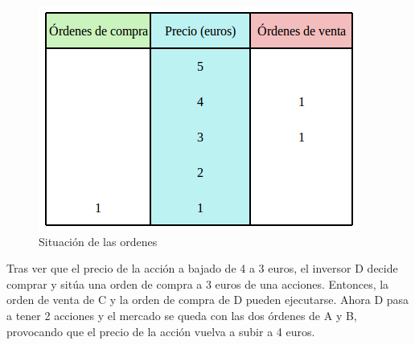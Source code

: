 \documentclass[12pt,a4paper]{article}
\begin{document}
				\begin{figure}[H]
					\centering
					\includegraphics[scale=2]{imagenes/ordenes_ejemplo.png}
					\caption{Situaci\'on de las ordenes}
					\label{fig:ordenes_ejemplo}
				\end{figure}
		
		
		Tras ver que el precio de la acci\'on a bajado de 4 a 3 euros, el inversor D decide comprar y sit\'ua una orden de compra a 3 euros de una acciones. Entonces, la orden de venta de C y la orden de compra de D pueden ejecutarse. Ahora D pasa a tener 2 acciones y el mercado se queda con las dos \'ordenes de A y B, provocando que el precio de la acci\'on vuelva a subir a 4 euros.\\
		
\end{document}
